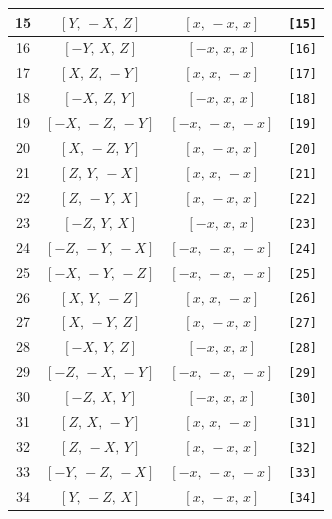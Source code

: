 \documentclass[fleqn,8pt]{jsarticle}
\begin{document}
\begin{longtable}{cccc}
15 & $\left[ Y,\, - X,\, Z \right]$ & $\left[ x,\, - x,\, x \right]$ & {\tt [15]} \\ \hline
16 & $\left[ - Y,\, X,\, Z \right]$ & $\left[ - x,\, x,\, x \right]$ & {\tt [16]} \\ \hline
17 & $\left[ X,\, Z,\, - Y \right]$ & $\left[ x,\, x,\, - x \right]$ & {\tt [17]} \\ \hline
18 & $\left[ - X,\, Z,\, Y \right]$ & $\left[ - x,\, x,\, x \right]$ & {\tt [18]} \\ \hline
19 & $\left[ - X,\, - Z,\, - Y \right]$ & $\left[ - x,\, - x,\, - x \right]$ & {\tt [19]} \\ \hline
20 & $\left[ X,\, - Z,\, Y \right]$ & $\left[ x,\, - x,\, x \right]$ & {\tt [20]} \\ \hline
21 & $\left[ Z,\, Y,\, - X \right]$ & $\left[ x,\, x,\, - x \right]$ & {\tt [21]} \\ \hline
22 & $\left[ Z,\, - Y,\, X \right]$ & $\left[ x,\, - x,\, x \right]$ & {\tt [22]} \\ \hline
23 & $\left[ - Z,\, Y,\, X \right]$ & $\left[ - x,\, x,\, x \right]$ & {\tt [23]} \\ \hline
24 & $\left[ - Z,\, - Y,\, - X \right]$ & $\left[ - x,\, - x,\, - x \right]$ & {\tt [24]} \\ \hline
25 & $\left[ - X,\, - Y,\, - Z \right]$ & $\left[ - x,\, - x,\, - x \right]$ & {\tt [25]} \\ \hline
26 & $\left[ X,\, Y,\, - Z \right]$ & $\left[ x,\, x,\, - x \right]$ & {\tt [26]} \\ \hline
27 & $\left[ X,\, - Y,\, Z \right]$ & $\left[ x,\, - x,\, x \right]$ & {\tt [27]} \\ \hline
28 & $\left[ - X,\, Y,\, Z \right]$ & $\left[ - x,\, x,\, x \right]$ & {\tt [28]} \\ \hline
29 & $\left[ - Z,\, - X,\, - Y \right]$ & $\left[ - x,\, - x,\, - x \right]$ & {\tt [29]} \\ \hline
30 & $\left[ - Z,\, X,\, Y \right]$ & $\left[ - x,\, x,\, x \right]$ & {\tt [30]} \\ \hline
31 & $\left[ Z,\, X,\, - Y \right]$ & $\left[ x,\, x,\, - x \right]$ & {\tt [31]} \\ \hline
32 & $\left[ Z,\, - X,\, Y \right]$ & $\left[ x,\, - x,\, x \right]$ & {\tt [32]} \\ \hline
33 & $\left[ - Y,\, - Z,\, - X \right]$ & $\left[ - x,\, - x,\, - x \right]$ & {\tt [33]} \\ \hline
34 & $\left[ Y,\, - Z,\, X \right]$ & $\left[ x,\, - x,\, x \right]$ & {\tt [34]} \\ \hline

\end{longtable}
\end{document}
